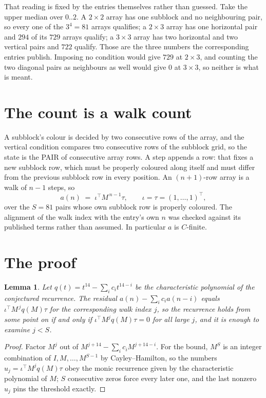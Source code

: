 \documentclass[11pt,a4paper]{article}
\theoremstyle{plain}
\newtheorem{lemma}[theorem]{Lemma}
\theoremstyle{definition}
\begin{document}
That reading is fixed by the entries themselves rather than guessed. Take the upper median
over $0..2$. A $2\times2$ array has one subblock and no neighbouring pair, so every one of the
$3^4=81$ arrays qualifies; a $2\times3$ array has one horizontal pair and $294$ of its $729$
arrays qualify; a $3\times3$ array has two horizontal and two vertical pairs and $722$
qualify. Those are the three numbers the corresponding entries publish. Imposing no condition
would give $729$ at $2\times3$, and counting the two diagonal pairs as neighbours as well
would give $0$ at $3\times3$, so neither is what is meant.

\section{The count is a walk count}

A subblock's colour is decided by two consecutive rows of the array, and
the vertical condition compares two consecutive rows of the subblock grid, so the state is the
PAIR of consecutive array rows. A step appends a row: that fixes a new subblock row, which
must be properly coloured along itself and must differ from the previous subblock row in every
position. An $(n+1)$-row array is a walk of $n-1$ steps, so
\[
a(n)\;=\;\iota^{\!\top}M^{\,n-1}\tau,\qquad\iota=\tau=(1,\dots,1)^{\!\top},
\]
over the $S=81$ pairs whose own subblock row is properly coloured.
The alignment of the walk index with the entry's own $n$ was checked against its published
terms rather than assumed. In particular $a$ is $C$-finite.

\section{The proof}

\begin{lemma}\label{lem:crit}
Let $q(t)=t^{14}-\sum_i c_it^{14-i}$ be the characteristic polynomial of the
conjectured recurrence. The residual $a(n)-\sum_ic_ia(n-i)$ equals
$\iota^{\!\top}M^{\,j}q(M)\tau$ for the corresponding walk index $j$, so the recurrence
holds from some point on if and only if $\iota^{\!\top}M^{j}q(M)\tau=0$ for all large $j$,
and it is enough to examine $j<S$.
\end{lemma}

\begin{proof}
Factor $M^{j}$ out of $M^{j+14}-\sum_ic_iM^{j+14-i}$. For the bound, $M^{S}$
is an integer combination of $I,M,\dots,M^{S-1}$ by Cayley--Hamilton, so the numbers
$u_j=\iota^{\!\top}M^{j}q(M)\tau$ obey the monic recurrence given by the characteristic
polynomial of $M$; $S$ consecutive zeros force every later one, and the last nonzero $u_j$
pins the threshold exactly.
\end{proof}
\end{document}
